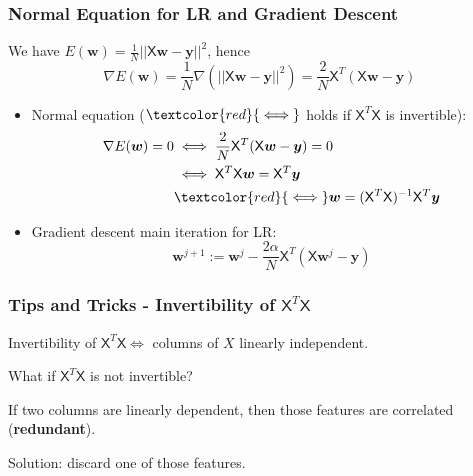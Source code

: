 \documentclass{beamer}
\begin{document}
	\begin{frame}
		\frametitle{Normal Equation for LR and Gradient Descent}
		We have $E(\bm{w}) = \frac{1}{N} ||\mathsf{X}\bm{w} - \bm{y}||^2$, hence
		\begin{equation*}
			\nabla E(\bm{w}) = \frac{1}{N} \nabla (||\mathsf{X}\bm{w} - \bm{y}||^2) = \frac{2}{N}\mathsf{X}^T(\mathsf{X}\bm{w} - \bm{y})
		\end{equation*}
	
	\begin{itemize}
		\item 	Normal equation ($\textcolor{red}{\iff}$ holds if $\mathsf{X}^T\mathsf{X}$ is invertible):
		\begin{align*}
			\nabla E(\bm{w}) = 0 &\iff \frac{2}{N}\mathsf{X}^T(\mathsf{X}\bm{w} - \bm{y}) = 0\\ 
			&\iff \mathsf{X}^T\mathsf{X}\bm{w} = \mathsf{X}^T\bm{y}\\
			& \textcolor{red}{\iff} \bm{w} = (\mathsf{X}^T\mathsf{X})^{-1}\mathsf{X}^T\bm{y}
		\end{align*}
		\item Gradient descent main iteration for LR:
		\begin{equation*}
			\bm{w}^{j+1} := \bm{w}^{j} - \frac{2\alpha}{N}\mathsf{X}^T(\mathsf{X}\bm{w}^j - \bm{y})
		\end{equation*}
	\end{itemize}

	\end{frame}

	\begin{frame}
		\frametitle{Tips and Tricks - Invertibility of $\mathsf{X}^T\mathsf{X}$}
		
		Invertibility of $\mathsf{X}^T\mathsf{X} \iff$ columns of $X$ linearly independent.
		
		\vspace{5mm}
		
		What if $\mathsf{X}^T\mathsf{X}$ is not invertible?
		
		\vspace{5mm}
		
		If two columns are linearly dependent, then those features are correlated (\textbf{redundant}).
		
		\vspace{5mm}
		
		Solution: discard one of those features.
	\end{frame}
\end{document}
